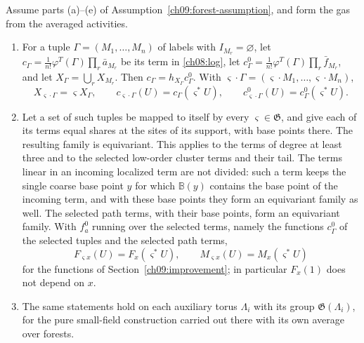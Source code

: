 \begin{proposition}
\label{ch09:family-equivariance}
Assume parts \textup{(a)}--\textup{(e)} of
Assumption~\ref{ch09:forest-assumption}, and form the gas from the
averaged activities.
\begin{enumerate}[label=\textup{(\roman*)}]
\item For a tuple $\Gamma=(M_1,\ldots,M_n)$ of labels with
 $I_{M_r}=\varnothing$, let
 $c_\Gamma=\frac1{n!}\varphi^T(\Gamma)\prod_r\bar a_{M_r}$ be its term
 in \eqref{ch08:log}, let
 $c^0_\Gamma=\frac1{n!}\varphi^T(\Gamma)\prod_r\bar f_{M_r}$, and let
 $X_\Gamma=\bigcup_rX_{M_r}$. Then $c_\Gamma=h_{X_\Gamma}c^0_\Gamma$.
 With
 $\varsigma\cdot\Gamma=(\varsigma\cdot M_1,\ldots,\varsigma\cdot M_n)$,
 \[
  X_{\varsigma\cdot\Gamma}=\varsigma X_\Gamma,\qquad
  c_{\varsigma\cdot\Gamma}(U)=c_\Gamma(\varsigma^*U),\qquad
  c^0_{\varsigma\cdot\Gamma}(U)=c^0_\Gamma(\varsigma^*U).
 \]
\item Let a set of such tuples be mapped to itself by every
 $\varsigma\in\mathfrak G$, and give each of its terms equal shares at
 the sites of its support, with base points there. The resulting family is
 equivariant. This applies to the terms of degree at least three and
 to the selected low-order cluster terms and their tail. The terms
 linear in an incoming localized term are not divided: such a term
 keeps the single coarse base point $y$ for which $\mathbb B(y)$ contains
 the base point of the incoming term, and with these base points they form
 an equivariant family as well. The selected path terms, with their
 base points, form an equivariant family. With $f_a^0$ running over the
 selected terms, namely the functions $c^0_\Gamma$ of the selected
 tuples and the selected path terms,
 \begin{equation}
  F_{\varsigma x}(U)=F_x(\varsigma^*U),\qquad
  M_{\varsigma x}(U)=M_x(\varsigma^*U)
  \label{ch09:share-equivariance}
 \end{equation}
 for the functions of Section~\ref{ch09:improvement}; in particular
 $F_x(1)$ does not depend on $x$.
\item The same statements hold on each auxiliary torus $\Lambda_i$
 with its group $\mathfrak G(\Lambda_i)$, for the pure small-field
 construction carried out there with its own average over forests.
\end{enumerate}
\end{proposition}

